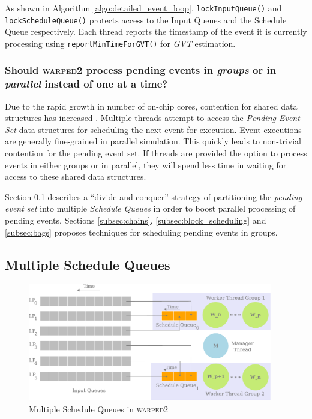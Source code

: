 \documentclass[11pt]{book}
\begin{document}
As shown in Algorithm \ref{algo:detailed_event_loop}, \texttt{lockInputQueue()} and
\texttt{lockScheduleQueue()} protects access to the Input Queues and the Schedule Queue respectively.  Each
thread reports the timestamp of the event it is currently processing using \texttt{reportMinTimeForGVT()} for
\emph{GVT} estimation.

\subsubsection{\textbf{Should \textsc{warped2} process pending events in \emph{groups} or in
\emph{parallel} instead of one at a time?}}
\label{subsubsec:should_parallelize}

Due to the rapid growth in number of on-chip cores, contention for shared data structures has increased
\cite{ghuloum-09}.  Multiple threads attempt to access the \emph{Pending Event Set} data structures for
scheduling the next event for execution.  Event executions are generally fine-grained in parallel simulation.
This quickly leads to non-trivial contention for the pending event set.  If threads are provided the option to
process events in either groups or in parallel, they will spend less time in waiting for access to these
shared data structures.

Section \ref{subsec:multiple_scheduleq} describes a ``divide-and-conquer'' strategy of partitioning the
\emph{pending event set} into multiple \emph{Schedule Queues} in order to boost parallel processing of pending
events.  Sections \ref{subsec:chains}, \ref{subsec:block_scheduling} and \ref{subsec:bags} proposes techniques
for scheduling pending events in groups.

\subsection{Multiple Schedule Queues}\label{subsec:multiple_scheduleq}

\begin{figure}
    \centering
    \includegraphics[width=0.95\textwidth]{figures/multiple_scheduleq.pdf}
    \caption{Multiple Schedule Queues in \textsc{warped2}}\label{fig:multiple_scheduleq}
\end{figure}
\end{document}
